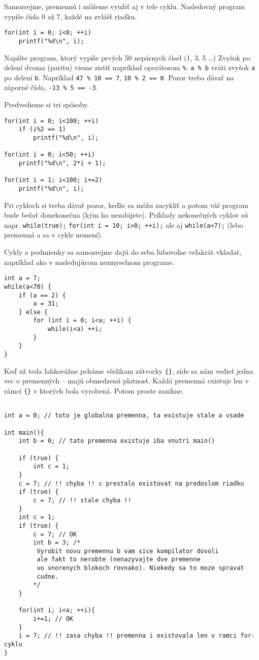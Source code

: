 Samozrejme, premennú i môžeme využiť aj v tele cyklu. Nasledovný program vypíše
čísla 0 až 7, každé na zvlášť riadku.
\begin{lstlisting}
for(int i = 0; i<8; ++i)
    printf("%d\n", i);
\end{lstlisting}

\cvicenie Napíšte program, ktorý vypíše prvých 50 nepárnych čísel (1, 3,
5 \dots) Zvyšok po delení dvoma (paritu) vieme zistiť napríklad operátorom \verb!%!.
\verb!a % b! vráti zvyšok \verb!a! po delení \verb!b!. Napríklad \verb!47 % 10 == 7!, \verb!10 % 2 == 0!.
Pozor treba dávať na záporné čísla, \verb!-13 % 5 == -3!.

\riesenie Predvedieme si tri spôsoby. 
\begin{lstlisting}
for(int i = 0; i<100; ++i)
    if (i%2 == 1)
        printf("%d\n", i);

for(int i = 0; i<50; ++i)
    printf("%d\n", 2*i + 1);

for(int i = 1; i<100; i+=2)
    printf("%d\n", i);
\end{lstlisting}

Pri cykloch si treba dávať pozor, keďže sa môžu zacykliť a potom váš program
bude bežať donekonečna (kým ho nezabijete).  Príklady nekonečných cyklov sú
napr. \verb!while(true);! \verb!for(int i = 10; i>0; ++i);! ale aj
\verb!while(a<7);! (lebo premenná a sa v cykle nemení).

\medskip

Cykly a podmienky sa samozrejme dajú do seba ľubovoľne veľakrát vkladať,
napríklad ako v nasledujúcom nezmyselnom programe.

\begin{lstlisting}
int a = 7;
while(a<70) {
    if (a == 2) {
        a = 31;
    } else {
        for (int i = 0; i<a; ++i) {
            while(i<a) ++i;
        }
    }
}
\end{lstlisting}

\medskip

Keď už teda ľahkovážne pcháme všelikam zátvorky \verb!{}!, zíde sa nám vedieť
jedna vec o premenných -- majú obmedzenú platnosť. Každá premenná existuje len
v rámci \verb!{}! v ktorých bola vyrobená.  Potom proste zanikne.

\begin{lstlisting}

int a = 0; // toto je globalna premenna, ta existuje stale a vsade

int main(){
    int b = 0; // tato premenna existuje iba vnutri main()

    if (true) {
        int c = 1;
    }
    c = 7; // !! chyba !! c prestalo existovat na predoslom riadku
    if (true) {
        c = 7; // !! stale chyba !!
    }
    int c = 1;
    if (true) {
        c = 7; // OK
        int b = 3; /*
         Vyrobit novu premennu b vam sice kompilator dovoli
         ale fakt to nerobte (nenazyvajte dve premenne
         vo vnorenych blokoch rovnako). Niekedy sa to moze spravat
         cudne.
        */
    }    

    for(int i; i<a; ++i){
        i+=1; // OK
    }
    i = 7; // !! zasa chyba !! premenna i existovala len v ramci for-cyklu
}
\end{lstlisting}

